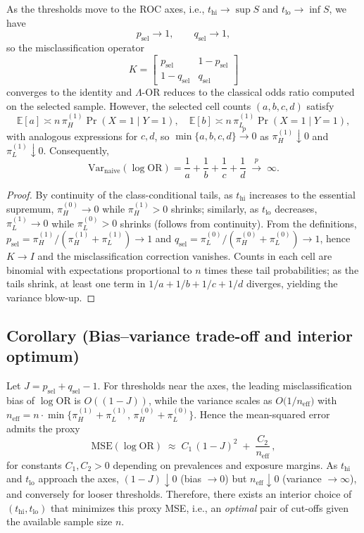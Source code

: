 \documentclass[lineno]{biometrika}
\begin{document}
\begin{lem}\label{lemsel}
As the thresholds move to the ROC axes, i.e., $t_{\mathrm{hi}}\!\to\!\sup S$ and $t_{\mathrm{lo}}\!\to\!\inf S$, we have
\[
p_{\text{sel}}\to 1,\qquad q_{\text{sel}}\to 1,
\]
so the misclassification operator
\[
K=\begin{bmatrix} p_{\text{sel}}&1-p_{\text{sel}}\\ 1-q_{\text{sel}}&q_{\text{sel}}\end{bmatrix}\]
converges to the identity and $\Lambda$-OR reduces to the classical odds ratio computed on the selected sample.
However, the selected cell counts $(a,b,c,d)$ satisfy
\[
\mathbb{E}[a]\asymp n\,\pi_H^{(1)}\Pr(X{=}1\mid Y{=}1),\quad
\mathbb{E}[b]\asymp n\,\pi_L^{(1)}\Pr(X{=}1\mid Y{=}1),
\]
with analogous expressions for $c,d$, so $\min\{a,b,c,d\}\stackrel{p}{\to}0$ as $\pi_H^{(1)}\!\downarrow 0$ and $\pi_L^{(1)}\!\downarrow 0$. Consequently,
\[
\mathrm{Var}_{\text{naive}}(\log\mathrm{OR})=\frac{1}{a}+\frac{1}{b}+\frac{1}{c}+\frac{1}{d}\;\xrightarrow{\;p\;}\;\infty.
\]
\end{lem}
\begin{proof}
By continuity of the class-conditional tails, as $t_{\mathrm{hi}}$ increases to the essential supremum,
$\pi_H^{(0)}\to 0$ while $\pi_H^{(1)}>0$ shrinks; similarly, as $t_{\mathrm{lo}}$ decreases,
$\pi_L^{(1)}\to 0$ while $\pi_L^{(0)}>0$ shrinks (follows from continuity). From the definitions,
$p_{\text{sel}}=\pi_H^{(1)}/(\pi_H^{(1)}+\pi_L^{(1)})\to 1$ and
$q_{\text{sel}}=\pi_L^{(0)}/(\pi_H^{(0)}+\pi_L^{(0)})\to 1$, hence $K\to I$ and
the misclassification correction vanishes. Counts in each cell are binomial with expectations proportional
to $n$ times these tail probabilities; as the tails shrink, at least one term in $1/a+1/b+1/c+1/d$
diverges, yielding the variance blow-up. 
\end{proof}

\subsection{Corollary (Bias–variance trade-off and interior optimum)}
Let $J=p_{\text{sel}}+q_{\text{sel}}-1$. For thresholds near the axes,
the leading misclassification bias of $\log\mathrm{OR}$ is $O((1-J))$, while the variance scales as
$O\!\big(1/n_{\text{eff}}\big)$ with $n_{\text{eff}}=n\cdot\min\{\pi_H^{(1)}+\pi_L^{(1)},\,\pi_H^{(0)}+\pi_L^{(0)}\}$.
Hence the mean-squared error admits the proxy
\[
\mathrm{MSE}(\log\mathrm{OR}) \;\approx\; C_1\,(1-J)^2 \;+\; \frac{C_2}{n_{\text{eff}}}\,,
\]
for constants $C_1,C_2>0$ depending on prevalences and exposure margins. As $t_{\mathrm{hi}}$ and $t_{\mathrm{lo}}$
approach the axes, $(1-J)\downarrow 0$ (bias $\to 0$) but $n_{\text{eff}}\downarrow 0$ (variance $\to\infty$),
and conversely for looser thresholds. Therefore, there exists an interior choice of $(t_{\mathrm{hi}},t_{\mathrm{lo}})$
that minimizes this proxy MSE, i.e., an \emph{optimal} pair of cut-offs given the available sample size $n$.
\end{document}

